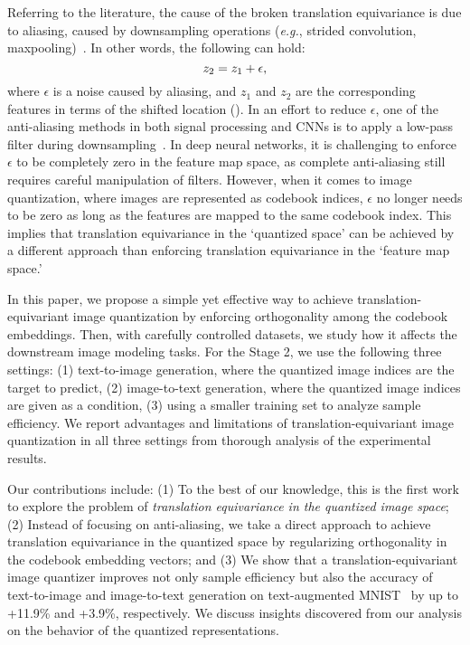 \documentclass{article}
\begin{document}
Referring to the literature, the cause of the broken translation equivariance is due to aliasing, caused by downsampling operations (\textit{e.g.}, strided convolution, maxpooling)~\cite{simoncelli1992shiftable,zhang2019making}.  In other words, the following can hold:
\vspace{-1mm}
\begin{equation}
  z_2 = z_1 + \epsilon,
\vspace{-1mm}
\end{equation}
where $\epsilon$ is a noise caused by aliasing, and $z_1$ and $z_2$ are the corresponding features in terms of the shifted location (). 
In an effort to reduce $\epsilon$, one of the anti-aliasing methods in both signal processing and CNNs is to apply a low-pass filter during downsampling~\cite{oppenheim1999discrete,gonzalez2009digital,zhang2019making,karras2021alias}. 
In deep neural networks, it is challenging to enforce $\epsilon$ to be completely zero in the feature map space, as complete anti-aliasing still requires careful manipulation of filters.
However, when it comes to image quantization, where images are represented as codebook indices, $\epsilon$ no longer needs to be zero as long as the features are mapped to the same codebook index. 
This implies that translation equivariance in the `quantized space' can be achieved by a different approach than enforcing translation equivariance in the `feature map space.'

In this paper, we propose a simple yet effective way to achieve translation-equivariant image quantization by enforcing orthogonality among the codebook embeddings.
Then, with carefully controlled datasets, we study how it affects the downstream image modeling tasks.
For the Stage 2, we use the following three settings:
(1) text-to-image generation, where the quantized image indices are the target to predict,
(2) image-to-text generation, where the quantized image indices are given as a condition,
(3) using a smaller training set to analyze sample efficiency.
We report advantages and limitations of translation-equivariant image quantization in all three settings from thorough analysis of the experimental results.

Our contributions include:
(1) To the best of our knowledge, this is the first work to explore the problem of \emph{translation equivariance in the quantized image space}; 
(2) Instead of focusing on anti-aliasing, we take a direct approach to achieve translation equivariance in the quantized space by regularizing orthogonality in the codebook embedding vectors; and 
(3) We show that a translation-equivariant image quantizer improves not only sample efficiency but also the accuracy of text-to-image and image-to-text generation on text-augmented MNIST~\cite{mnist} by up to +11.9\% and +3.9\%, respectively. We discuss insights discovered from our analysis on the behavior of the quantized representations.
\end{document}
